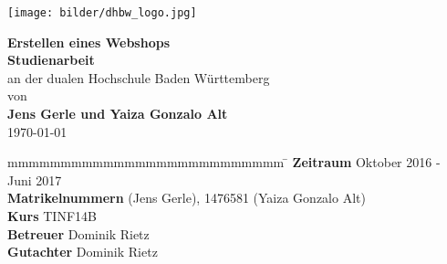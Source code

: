 \begin{titlepage}
	\centering
	\texttt{[image: bilder/dhbw\_logo.jpg]}
	\enlargethispage{20mm}
	\begin{center}
		\vspace*{12mm}	{\LARGE\textbf{Erstellen eines Webshops} }\\
		\vspace*{12mm}	{\large\textbf{Studienarbeit}}\\
		\vspace*{3mm}	an der dualen Hochschule Baden Württemberg\\
		\vspace*{3mm}	von\\
		\vspace*{3mm}	{\large\textbf{Jens Gerle und Yaiza Gonzalo Alt}}\\
		\vspace*{12mm}	\today\\
	\end{center}
	\vspace*{65mm}
	\begin{spacing}{1.2}
		\begin{tabbing}
			mmmmmmmmmmmmmmmmmmmmmmmmmm             \= \kill
			\textbf{Zeitraum}       			\>  Oktober 2016 - Juni 2017\\
			\textbf{Matrikelnummern}			 (Jens Gerle), 1476581 (Yaiza Gonzalo Alt)\\
			\textbf{Kurs}  						\>  TINF14B\\
			\textbf{Betreuer}       			\>  Dominik Rietz\\
			\textbf{Gutachter}      			\>  Dominik Rietz
		\end{tabbing}
	\end{spacing}
\end{titlepage}
